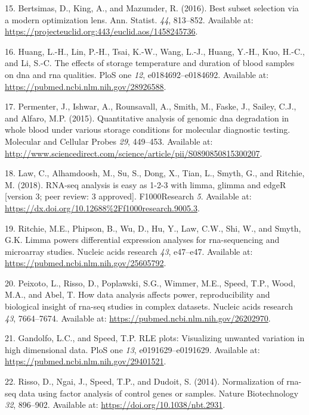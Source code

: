 \documentclass[
]{book}
\newenvironment{cslreferences}%
  {}%
  {\par}
\begin{document}
\begin{cslreferences}
\leavevmode\hypertarget{ref-Bertsimas:2016aa}{}%
15. Bertsimas, D., King, A., and Mazumder, R. (2016). Best subset selection via a modern optimization lens. Ann. Statist. \emph{44}, 813--852. Available at: \url{https://projecteuclid.org:443/euclid.aos/1458245736}.

\leavevmode\hypertarget{ref-Huang:2017aa}{}%
16. Huang, L.-H., Lin, P.-H., Tsai, K.-W., Wang, L.-J., Huang, Y.-H., Kuo, H.-C., and Li, S.-C. The effects of storage temperature and duration of blood samples on dna and rna qualities. PloS one \emph{12}, e0184692--e0184692. Available at: \url{https://pubmed.ncbi.nlm.nih.gov/28926588}.

\leavevmode\hypertarget{ref-Permenter:2015aa}{}%
17. Permenter, J., Ishwar, A., Rounsavall, A., Smith, M., Faske, J., Sailey, C.J., and Alfaro, M.P. (2015). Quantitative analysis of genomic dna degradation in whole blood under various storage conditions for molecular diagnostic testing. Molecular and Cellular Probes \emph{29}, 449--453. Available at: \url{http://www.sciencedirect.com/science/article/pii/S0890850815300207}.

\leavevmode\hypertarget{ref-Law:2018aa}{}%
18. Law, C., Alhamdoosh, M., Su, S., Dong, X., Tian, L., Smyth, G., and Ritchie, M. (2018). RNA-seq analysis is easy as 1-2-3 with limma, glimma and edgeR {[}version 3; peer review: 3 approved{]}. F1000Research \emph{5}. Available at: \url{https://dx.doi.org/10.12688\%2Ff1000research.9005.3}.

\leavevmode\hypertarget{ref-Ritchie:2015aa}{}%
19. Ritchie, M.E., Phipson, B., Wu, D., Hu, Y., Law, C.W., Shi, W., and Smyth, G.K. Limma powers differential expression analyses for rna-sequencing and microarray studies. Nucleic acids research \emph{43}, e47--e47. Available at: \url{https://pubmed.ncbi.nlm.nih.gov/25605792}.

\leavevmode\hypertarget{ref-Peixoto:2015aa}{}%
20. Peixoto, L., Risso, D., Poplawski, S.G., Wimmer, M.E., Speed, T.P., Wood, M.A., and Abel, T. How data analysis affects power, reproducibility and biological insight of rna-seq studies in complex datasets. Nucleic acids research \emph{43}, 7664--7674. Available at: \url{https://pubmed.ncbi.nlm.nih.gov/26202970}.

\leavevmode\hypertarget{ref-Gandolfo:2018aa}{}%
21. Gandolfo, L.C., and Speed, T.P. RLE plots: Visualizing unwanted variation in high dimensional data. PloS one \emph{13}, e0191629--e0191629. Available at: \url{https://pubmed.ncbi.nlm.nih.gov/29401521}.

\leavevmode\hypertarget{ref-Risso:2014aa}{}%
22. Risso, D., Ngai, J., Speed, T.P., and Dudoit, S. (2014). Normalization of rna-seq data using factor analysis of control genes or samples. Nature Biotechnology \emph{32}, 896--902. Available at: \url{https://doi.org/10.1038/nbt.2931}.


\end{cslreferences}
\end{document}
